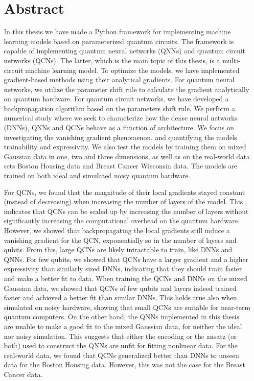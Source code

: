 \chapter*{Abstract}
\thispagestyle{plain}

In this thesis we have made a Python framework for implementing machine learning models based on parameterized quantum circuits. The framework is capable of implementing quantum neural networks (QNNs) and quantum circuit networks (QCNs). The latter, which is the main topic of this thesis, is a multi-circuit machine learning model. To optimize the models, we have implemented gradient-based methods using their analytical gradients. For quantum neural networks, we utilize the parameter shift rule to calculate the gradient analytically on quantum hardware. For quantum circuit networks, we have developed a backpropagation algorithm based on the parameters shift rule. We perform a numerical study where we seek to characterize how the dense neural networks (DNNs), QNNs and QCNs behave as a function of architecture. We focus on investigating the vanishing gradient phenomenon, and quantifying the models trainability and expressivity. We also test the models by training them on mixed Gaussian data in one, two and three dimensions, as well as on the real-world data sets Boston Housing data and Breast Cancer Wisconsin data. The models are trained on both ideal and simulated noisy quantum hardware.

For QCNs, we found that the magnitude of their local gradients stayed constant (instead of decreasing) when increasing the number of layers of the model. This indicates that QCNs can be scaled up by increasing the number of layers without significantly increasing the computational overhead on the quantum hardware. However, we showed that backpropagating the local gradients still induce a vanishing gradient for the QCN, exponentially so in the number of layers and qubits. From this, large QCNs are likely intractable to train, like DNNs and QNNs. For few qubits, we showed that QCNs have a larger gradient and a higher expressivity than similarly sized DNNs, indicating that they should train faster and make a better fit to data. When training the QCNs and DNNs on the mixed Gaussian data, we showed that QCNs of few qubits and layers indeed trained faster and achieved a better fit than similar DNNs. This holds true also when simulated on noisy hardware, showing that small QCNs are suitable for near-term quantum computers. On the other hand, the QNNs implemented in this thesis are unable to make a good fit to the mixed Gaussian data, for neither the ideal nor noisy simulation. This suggests that either the encoding or the ansatz (or both) used to construct the QNNs are unfit for fitting nonlinear data. For the real-world data, we found that QCNs generalized better than DNNs to unseen data for the Boston Housing data. However, this was not the case for the Breast Cancer data.
